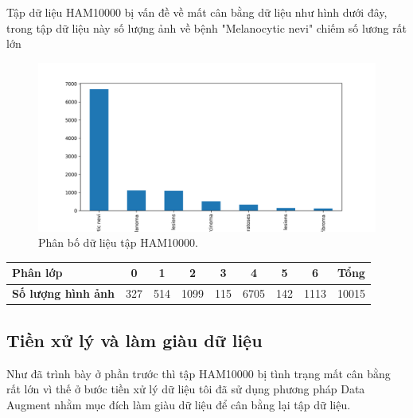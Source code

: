 \documentclass[12pt,a4paper]{article}
\begin{document}
	\noindent
	Tập dữ liệu HAM10000 bị vấn đề về mất cân bằng dữ liệu như hình dưới đây, trong tập dữ liệu này số lượng ảnh về bệnh "Melanocytic nevi" chiếm số lương rất lớn\\	
	
	
	\begin{figure}[h!]
		\centering
		\includegraphics[width=0.5\linewidth]{./images/imbalance.png}
		\caption{Phân bố dữ liệu tập HAM10000.}
		\label{fig:ham10000}
	\end{figure}

	\begin{center}
		\begin{tabular}{|l|c|c|c|c|c|c|c|l|}
			\hline
			\rowcolor[HTML]{000000} 
			{\color[HTML]{FFFFFF} \textbf{Phân lớp}} & {\color[HTML]{FFFFFF} \textbf{0}} & {\color[HTML]{FFFFFF} \textbf{1}} & {\color[HTML]{FFFFFF} \textbf{2}} & {\color[HTML]{FFFFFF} \textbf{3}} & {\color[HTML]{FFFFFF} \textbf{4}} & {\color[HTML]{FFFFFF} \textbf{5}} & {\color[HTML]{FFFFFF} \textbf{6}} & {\color[HTML]{FFFFFF} \textbf{Tổng}} \\ \hline
			\textbf{Số lượng hình ảnh}               & 327                               & 514                               & 1099                              & 115                               & 6705                              & 142                               & 1113                              & 10015                                \\ \hline
		\end{tabular}
	\end{center}
	
	\subsection{Tiền xử lý và làm giàu dữ liệu}
	
	Như đã trình bày ở phần trước thì tập HAM10000 bị tình trạng mất cân bằng rất lớn vì thế ở bước tiền xử lý dữ liệu tôi đã sử dụng phương pháp Data Augment nhằm mục đích làm giàu dữ liệu để cân bằng lại tập dữ liệu.\\
	
\end{document}
